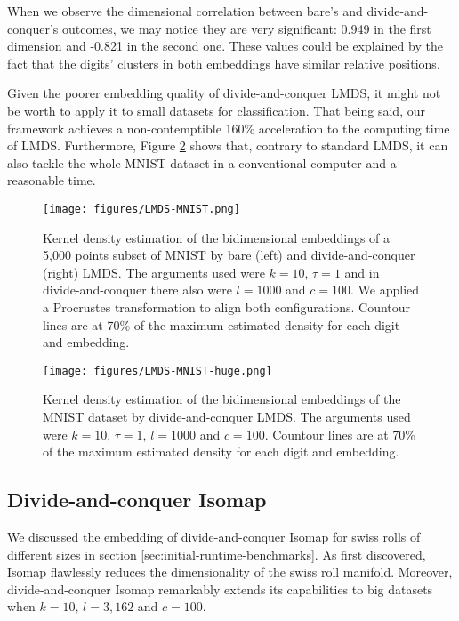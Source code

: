 When we observe the dimensional correlation between bare's and divide-and-conquer's outcomes, we may notice they are very significant: 0.949 in the first dimension and -0.821 in the second one. These values could be explained by the fact that the digits' clusters in both embeddings have similar relative positions.

Given the poorer embedding quality of divide-and-conquer LMDS, it might not be worth to apply it to small datasets for classification. That being said, our framework achieves a non-contemptible 160\% acceleration to the computing time of LMDS. Furthermore, Figure \ref{fig:LMDS-MNIST-huge} shows that, contrary to standard LMDS, it can also tackle the whole MNIST dataset in a conventional computer and a reasonable time.

\begin{figure}[ht]
    \centering
    \texttt{[image: figures/LMDS-MNIST.png]}
    \caption{Kernel density estimation of the bidimensional embeddings of a 5,000 points subset of MNIST \citep{Cohen2017} by bare (left) and divide-and-conquer (right) LMDS. The arguments used were $k=10,\, \tau = 1$ and in divide-and-conquer there also were $l=1000$ and $c=100$. We applied a Procrustes transformation to align both configurations. Countour lines are at 70\% of the maximum estimated density for each digit and embedding.}
    \label{fig:LMDS-MNIST}
\end{figure}

\begin{figure}[ht]
    \centering
    \texttt{[image: figures/LMDS-MNIST-huge.png]}
    \caption{Kernel density estimation of the bidimensional embeddings of the MNIST dataset \citep{Cohen2017} by divide-and-conquer LMDS. The arguments used were $k=10,\, \tau = 1, \, l=1000$ and $c=100$. Countour lines are at 70\% of the maximum estimated density for each digit and embedding.}
    \label{fig:LMDS-MNIST-huge}
\end{figure}

\subsection{Divide-and-conquer Isomap}

We discussed the embedding of divide-and-conquer Isomap for swiss rolls of different sizes in section \ref{sec:initial-runtime-benchmarks}. As \citet{Spiwokv2007} first discovered, Isomap flawlessly reduces the dimensionality of the swiss roll manifold. Moreover, divide-and-conquer Isomap remarkably extends its capabilities to big datasets when $k=10,\, l=3,162$ and $c=100$.

